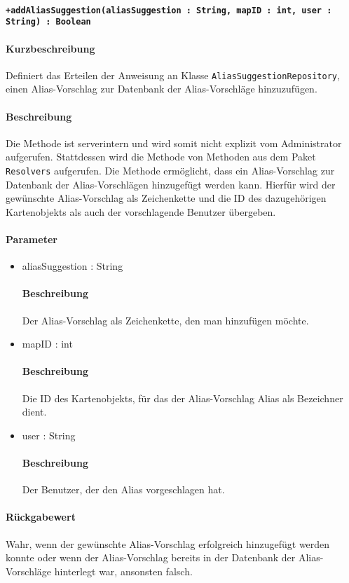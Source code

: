 \paragraph*{\texttt{+addAliasSuggestion(aliasSuggestion : String, mapID : int, user : String) : Boolean}}%
\paragraph*{Kurzbeschreibung}
Definiert das Erteilen der Anweisung an Klasse \texttt{AliasSuggestionRepository}, einen Alias-Vorschlag zur Datenbank der Alias-Vorschläge hinzuzufügen.
\paragraph*{Beschreibung}
Die Methode ist serverintern und wird somit nicht explizit vom Administrator aufgerufen.
Stattdessen wird die Methode von Methoden aus dem Paket \texttt{Resolvers} aufgerufen.
Die Methode ermöglicht, dass ein Alias-Vorschlag zur Datenbank der Alias-Vorschlägen hinzugefügt werden kann.
Hierfür wird der gewünschte Alias-Vorschlag als Zeichenkette und die ID des dazugehörigen Kartenobjekts als auch der vorschlagende Benutzer übergeben.
\paragraph*{Parameter}
\begin{itemize}
    \item aliasSuggestion : String
    		\paragraph*{Beschreibung}
    		Der Alias-Vorschlag als Zeichenkette, den man hinzufügen möchte.
    \item mapID : int
    		\paragraph*{Beschreibung}
    		Die ID des Kartenobjekts, für das der Alias-Vorschlag Alias als Bezeichner dient.
    	\item user : String
    		\paragraph*{Beschreibung}
    		Der Benutzer, der den Alias vorgeschlagen hat.
\end{itemize}
\paragraph*{Rückgabewert}
Wahr, wenn der gewünschte Alias-Vorschlag erfolgreich hinzugefügt werden konnte oder wenn der Alias-Vorschlag bereits in der Datenbank der Alias-Vorschläge hinterlegt war, ansonsten falsch.
